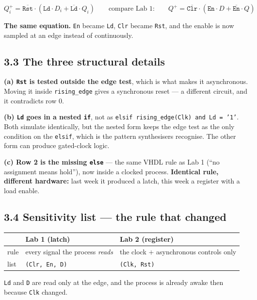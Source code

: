 \documentclass[11pt]{article}
\newcommand{\code}[1]{\texttt{#1}}
\begin{document}
\[
Q_i^{+} = \overline{\code{Rst}}\cdot\left( \code{Ld}\cdot D_i + \overline{\code{Ld}}\cdot Q_i \right)
\qquad\text{compare Lab 1:}\qquad
Q^{+} = \overline{\code{Clr}}\cdot\left( \code{En}\cdot D + \overline{\code{En}}\cdot Q \right)
\]

\textbf{The same equation.} \code{En} became \code{Ld}, \code{Clr} became
\code{Rst}, and the enable is now sampled at an edge instead of continuously.

\subsection*{3.3 The three structural details}

\textbf{(a) \code{Rst} is tested outside the edge test}, which is what makes it
asynchronous. Moving it inside \code{rising\_edge} gives a synchronous reset ---
a different circuit, and it contradicts row 0.

\textbf{(b) \code{Ld} goes in a nested \code{if}}, not as
\code{elsif rising\_edge(Clk) and Ld = '1'}. Both simulate identically, but the
nested form keeps the edge test as the only condition on the \code{elsif}, which
is the pattern synthesisers recognise. The other form can produce gated-clock
logic.

\textbf{(c) Row 2 is the missing \code{else}} --- the same VHDL rule as Lab 1
(``no assignment means hold''), now inside a clocked process. \textbf{Identical
rule, different hardware:} last week it produced a latch, this week a register
with a load enable.

\subsection*{3.4 Sensitivity list --- the rule that changed}

\begin{center}
\begin{tabular}{lll}
\toprule
& Lab 1 (latch) & Lab 2 (register) \\
\midrule
rule & every signal the process \emph{reads} & the clock $+$ asynchronous controls only \\
list & \code{(Clr, En, D)} & \code{(Clk, Rst)} \\
\bottomrule
\end{tabular}
\end{center}

\code{Ld} and \code{D} are read only at the edge, and the process is already awake
then because \code{Clk} changed.
\end{document}
